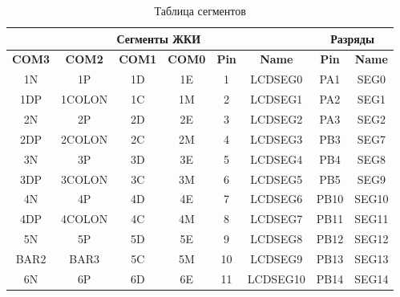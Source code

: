 \begin{table}[H]
\begin{center}
\caption{Таблица сегментов}\label{SegmentTable}
\begin{tabular}{|c|c|c|c|c|c|c|c|}
\hline
\multicolumn{6}{|c|}{\textbf{Сегменты ЖКИ}}                                                  & \multicolumn{2}{c|}{\textbf{Разряды}} \\ \hline
\textbf{COM3} & \textbf{COM2} & \textbf{COM1} & \textbf{COM0} & \textbf{Pin} & \textbf{Name} & \textbf{Pin}      & \textbf{Name}     \\ \hline
1N            & 1P            & 1D            & 1E            & 1            & LCDSEG0       & PA1               & SEG0              \\ \hline
1DP           & 1COLON        & 1C            & 1M            & 2            & LCDSEG1       & PA2               & SEG1              \\ \hline
2N            & 2P            & 2D            & 2E            & 3            & LCDSEG2       & PA3               & SEG2              \\ \hline
2DP           & 2COLON        & 2C            & 2M            & 4            & LCDSEG3       & PB3               & SEG7              \\ \hline
3N            & 3P            & 3D            & 3E            & 5            & LCDSEG4       & PB4               & SEG8              \\ \hline
3DP           & 3COLON        & 3C            & 3M            & 6            & LCDSEG5       & PB5               & SEG9              \\ \hline
4N            & 4P            & 4D            & 4E            & 7            & LCDSEG6       & PB10              & SEG10             \\ \hline
4DP           & 4COLON        & 4C            & 4M            & 8            & LCDSEG7       & PB11              & SEG11             \\ \hline
5N            & 5P            & 5D            & 5E            & 9            & LCDSEG8       & PB12              & SEG12             \\ \hline
BAR2          & BAR3          & 5C            & 5M            & 10           & LCDSEG9       & PB13              & SEG13             \\ \hline
6N            & 6P            & 6D            & 6E            & 11           & LCDSEG10      & PB14              & SEG14             \\ \hline

\end{tabular}
\end{center}
\end{table}
